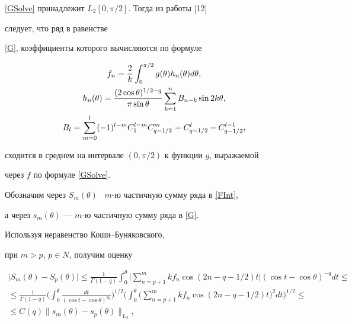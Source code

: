\eqref{GSolve} принадлежит $L_2[0,\pi/2]$. Тогда из работы [12]


следует, что ряд в равенстве


\eqref{G}, коэффициенты которого вычисляются по формуле


\begin{gather}\label{Koef}


f_n=\frac{2}{k} \int_0^{\pi/2} g(\theta)h_n(\theta)d\theta,\\


%


h_n(\theta)= \frac{(2\cos\theta)^{1/2-q}}{\pi\sin\theta}


\sum\limits_{k=1}^n B_{n-k}\sin 2k\theta,\notag \\


%


B_l=\sum_{m=0}^l (-1)^{l-m}C_1^{l-m}C_{q-1/2}^{m} =


C_{q-1/2}^{l}-C_{q-1/2}^{l-1},\notag


\end{gather}


сходится в среднем на интервале $(0,\pi/2)$ к функции $g$, выражаемой 


через $f$ по формуле \eqref{GSolve}.





Обозначим через $S_{m}(\theta)$ \ $m$-ю частичную сумму ряда в \eqref{FInt},


а через $s_{m}(\theta)$ --- $m$-ю частичную сумму ряда в \eqref{G}. 


Используя неравенство Коши--Буняковского,


при $m>p$, $p\in N$, получим оценку


\begin{gather*}


\big|S_{m}(\theta)-S_{p}(\theta)\big| \leq 


\frac{1}{\Gamma(1-q)}\int_{0}^{\theta} \bigg|\sum_{n=p+1}^{m}


kf_n\cos(2n-q-1/2)t\bigg| (\cos t- \cos \theta)^{-q} dt\leq\\


%


\leq \frac{1}{\Gamma(1-q)}\bigg(\int_{0}^{\theta}


\frac{dt}{(\cos t- \cos \theta)^{2q}}\bigg)^{1/2}


\bigg(\int_{0}^{\theta} \bigg( \sum_{n=p+1}^{m} kf_n\cos(2n-q-1/2)t\bigg)^2


dt\bigg)^{1/2}\leq \\


%


\leq C(q) \big\|s_{m}(\theta) - s_{p}(\theta)\big\|_{L_2},


\end{gather*}


